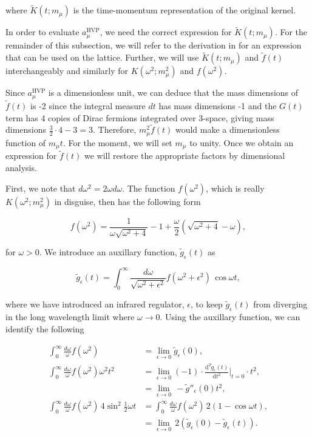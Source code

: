 \documentclass{article}
\numberwithin{equation}{section} %
\begin{document}
\noindent where $\tilde{K}(t;m_\mu)$ is the time-momentum representation of the original kernel.

In order to evaluate $a_\mu^\mathrm{HVP}$, we need the correct expression for $\tilde{K}(t;m_\mu)$. For the remainder of this subsection, we will refer to the derivation in \cite{dellamorte} for an expression that can be used on the lattice. Further, we will use $\tilde{K}(t;m_\mu)$ and $\tilde{f}(t)$ interchangeably and similarly for $K(\omega^2;m_\mu^2)$ and $f(\omega^2)$. 

Since $a_\mu^\mathrm{HVP}$  is a dimensionless unit, we can deduce that the mass dimensions of $\tilde{f}(t)$ is -2 since the integral measure $dt$ has mass dimensions -1 and the $G(t)$ term has 4 copies of Dirac fermions integrated over 3-space, giving mass dimensions $\frac{3}{2}\cdot 4 - 3 = 3$. Therefore, $m_\mu^2 \tilde{f}(t)$ would make a dimensionless function of $m_\mu t$. For the moment, we will set $m_\mu$ to unity. Once we obtain an expression for $\tilde{f}(t)$ we will restore the appropriate factors by dimensional analysis.

First, we note that $d\omega^2=2\omega d\omega$. The function $f(\omega^2)$, which is really $K(\omega^2;m_\mu^2)$ in disguise, then has the following form 

\begin{equation}
f(\omega^2) = \frac{1}{\omega\sqrt{\omega^2 + 4}} - 1 + \frac{\omega}{2}(\sqrt{\omega^2 + 4} - \omega),
\end{equation}

\noindent for $\omega>0$. We introduce an auxillary function, $\tilde{g}_\epsilon(t)$ as 

\begin{equation}
\tilde{g}_\epsilon(t) = \int^\infty_0 \frac{d\omega}{\sqrt{\omega^2 + \epsilon^2}} f(\omega^2 + \epsilon^2)\, \cos \omega t,
\label{aux func}
\end{equation}

\noindent where we have introduced an infrared regulator, $\epsilon$, to keep $\tilde{g}_\epsilon(t)$ from diverging in the long wavelength limit where $\omega\rightarrow 0$. Using the auxillary function, we can identify the following

\begin{equation}
\begin{split}
\int^\infty_0 \frac{d\omega}{\omega} f(\omega^2) &= \lim_{\epsilon\rightarrow 0} \tilde{g}_\epsilon(0),\\
\int^\infty_0 \frac{d\omega}{\omega} f(\omega^2)\omega^2 t^2 &= \lim_{\epsilon\rightarrow 0} (-1)\cdot\frac{\mathrm{d}^2\tilde{g}_\epsilon(t)}{\mathrm{d}t^2}\bigg\vert_{t=0} \cdot t^2,\\
&=\lim_{\epsilon\rightarrow 0} \, - \tilde{g}''_\epsilon(0)t^2,\\
\int^\infty_0 \frac{d\omega}{\omega} f(\omega^2)\,4 \sin^2 \frac{1}{2}\omega t &= \int^\infty_0 \frac{d\omega}{\omega} f(\omega^2)\,2(1- \cos\omega t) ,\\ 
&= \lim_{\epsilon\rightarrow 0}\, 2(\tilde{g}_\epsilon(0)-\tilde{g}_\epsilon(t)).
\end{split}
\end{equation}
\end{document}
